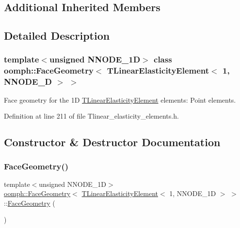 \subsection*{Additional Inherited Members}


\subsection{Detailed Description}
\subsubsection*{template$<$unsigned N\+N\+O\+D\+E\+\_\+1D$>$\newline
class oomph\+::\+Face\+Geometry$<$ T\+Linear\+Elasticity\+Element$<$ 1, N\+N\+O\+D\+E\+\_\+D $>$ $>$}

Face geometry for the 1D \hyperlink{classoomph_1_1TLinearElasticityElement}{T\+Linear\+Elasticity\+Element} elements\+: Point elements. 

Definition at line 211 of file Tlinear\+\_\+elasticity\+\_\+elements.\+h.



\subsection{Constructor \& Destructor Documentation}
\mbox{\label{classoomph_1_1FaceGeometry_3_01TLinearElasticityElement_3_011_00_01NNODE__1D_01_4_01_4_abe0f31deb78ec0f40049b7ec68180441}} 
\subsubsection{\texorpdfstring{Face\+Geometry()}{FaceGeometry()}}
{\footnotesize\ttfamily template$<$unsigned N\+N\+O\+D\+E\+\_\+1D$>$ \\
\hyperlink{classoomph_1_1FaceGeometry}{oomph\+::\+Face\+Geometry}$<$ \hyperlink{classoomph_1_1TLinearElasticityElement}{T\+Linear\+Elasticity\+Element}$<$ 1, N\+N\+O\+D\+E\+\_\+1D $>$ $>$\+::\hyperlink{classoomph_1_1FaceGeometry}{Face\+Geometry} (\begin{DoxyParamCaption}{ }\end{DoxyParamCaption})\hspace{0.3cm}{\ttfamily [inline]}}



